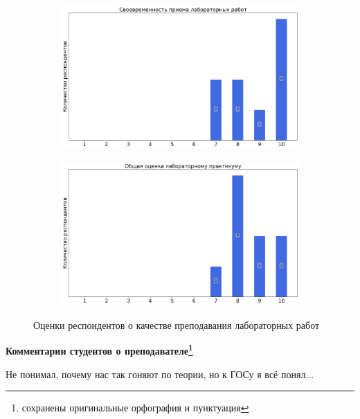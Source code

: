 \begin{figure}[H]
\begin{subfigure}[b]{0.45\textwidth}
                    \centering
                    \includegraphics[width=\textwidth]{images/3 course/Общая физика - квантовая физика/labniks-marks-Салмин В.В.-2.png}
                \end{subfigure}
                \begin{subfigure}[b]{0.45\textwidth}
                    \centering
                    \includegraphics[width=\textwidth]{images/3 course/Общая физика - квантовая физика/labniks-marks-Салмин В.В.-3.png}
                \end{subfigure}	
                \caption{Оценки респондентов о качестве преподавания лабораторных работ}
            \end{figure}

            \textbf{Комментарии студентов о преподавателе\protect\footnote{сохранены оригинальные орфография и пунктуация}}  
                \begin{commentbox} 
                    Не понимал, почему нас так гоняют по теории, но к ГОСу я всё понял... 
                \end{commentbox} 

